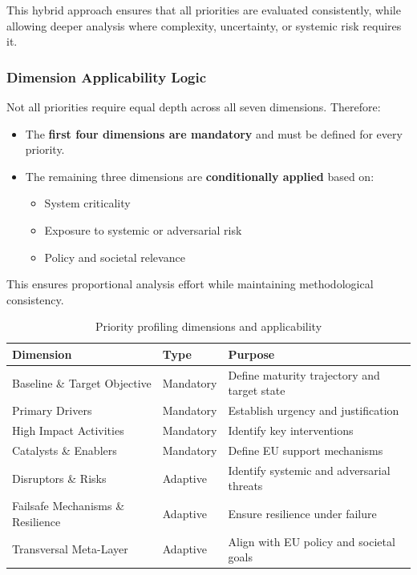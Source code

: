 \documentclass{ieeeaccess}
\begin{document}
This hybrid approach ensures that all priorities are evaluated consistently, while allowing deeper analysis where complexity, uncertainty, or systemic risk requires it.

\subsubsection*{Dimension Applicability Logic}
Not all priorities require equal depth across all seven dimensions. Therefore:

\begin{itemize}
    \item The \textbf{first four dimensions are mandatory} and must be defined for every priority.
    \item The remaining three dimensions are \textbf{conditionally applied} based on:
    \begin{itemize}
        \item System criticality
        \item Exposure to systemic or adversarial risk
        \item Policy and societal relevance
    \end{itemize}
\end{itemize}

This ensures proportional analysis effort while maintaining methodological consistency.

\begin{table}[!t]
\centering
\caption{Priority profiling dimensions and applicability}
\begin{tabular}{p{5cm} p{3cm} p{6cm}}
\toprule
\textbf{Dimension} & \textbf{Type} & \textbf{Purpose} \\
\midrule
Baseline \& Target Objective & Mandatory & Define maturity trajectory and target state \\
Primary Drivers & Mandatory & Establish urgency and justification \\
High Impact Activities & Mandatory & Identify key interventions \\
Catalysts \& Enablers & Mandatory & Define EU support mechanisms \\
Disruptors \& Risks & Adaptive & Identify systemic and adversarial threats \\
Failsafe Mechanisms \& Resilience & Adaptive & Ensure resilience under failure \\
Transversal Meta-Layer & Adaptive & Align with EU policy and societal goals \\
\bottomrule
\end{tabular}
\end{table}
\end{document}

